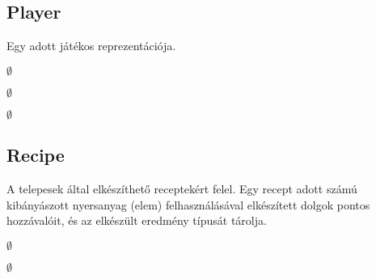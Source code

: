 \subsection{Player}
\begin{class-template-responsibility}
Egy adott játékos reprezentációja. 
\end{class-template-responsibility}
\begin{class-template-interface}
$\emptyset$
\end{class-template-interface}
\begin{class-template-baseclass}
$\emptyset$
\end{class-template-baseclass}
\begin{class-template-attribute}
\end{class-template-attribute}
\begin{class-template-method}
\item[] $\emptyset$
\end{class-template-method}


\subsection{Recipe}
\begin{class-template-responsibility}
A telepesek által elkészíthető receptekért felel. Egy recept adott számú kibányászott nyersanyag (elem) felhasználásával elkészített dolgok pontos hozzávalóit, és az elkészült eredmény típusát tárolja. 
\end{class-template-responsibility}
\begin{class-template-interface}
$\emptyset$
\end{class-template-interface}
\begin{class-template-baseclass}
$\emptyset$
\end{class-template-baseclass}
\begin{class-template-attribute}
\end{class-template-attribute}
\begin{class-template-method}
\end{class-template-method}


